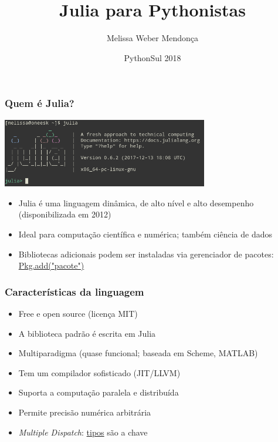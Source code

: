 \documentclass{beamer}
\title{Julia para Pythonistas}
\author{Melissa Weber Mendonça}
\date{PythonSul 2018}
\begin{document}
\maketitle

\begin{frame}
	\frametitle{Quem é Julia?}
	\begin{center}
		\includegraphics[width=9cm]{juliaconsole.png}
   	\end{center}
	\begin{itemize}
        \item Julia é uma linguagem dinâmica, de alto nível e alto desempenho (disponibilizada em 2012)
   		\item Ideal para computação científica e numérica; também ciência de dados
        \item Bibliotecas adicionais podem ser instaladas via gerenciador de pacotes: \underline{Pkg.add("pacote")}
    \end{itemize}
\end{frame}

\begin{frame}
	\frametitle{Características da linguagem}
    \begin{itemize}
    	\item Free e open source (licença MIT)
    	\item A biblioteca padrão é escrita em Julia
        \item Multiparadigma (quase funcional; baseada em Scheme, MATLAB)
    	\item Tem um compilador sofisticado (JIT/LLVM)
        \item Suporta a computação paralela e distribuída
        \item Permite precisão numérica arbitrária
        \item \emph{Multiple Dispatch}: \underline{tipos} são a chave
    \end{itemize}
\end{frame}
\end{document}
